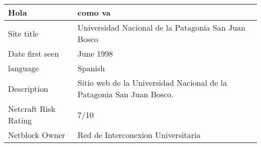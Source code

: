\begin{longtable}[]{@{}ll@{}}
\toprule
\begin{minipage}[b]{0.47\columnwidth}\raggedright
Hola\strut
\end{minipage} & \begin{minipage}[b]{0.47\columnwidth}\raggedright
como va\strut
\end{minipage}\tabularnewline
\midrule
\endhead
\begin{minipage}[t]{0.47\columnwidth}\raggedright
Site title\strut
\end{minipage} & \begin{minipage}[t]{0.47\columnwidth}\raggedright
Universidad Nacional de la Patagonia San Juan Bosco\strut
\end{minipage}\tabularnewline
\begin{minipage}[t]{0.47\columnwidth}\raggedright
Date first seen\strut
\end{minipage} & \begin{minipage}[t]{0.47\columnwidth}\raggedright
June 1998\strut
\end{minipage}\tabularnewline
\begin{minipage}[t]{0.47\columnwidth}\raggedright
language\strut
\end{minipage} & \begin{minipage}[t]{0.47\columnwidth}\raggedright
Spanish\strut
\end{minipage}\tabularnewline
\begin{minipage}[t]{0.47\columnwidth}\raggedright
Description\strut
\end{minipage} & \begin{minipage}[t]{0.47\columnwidth}\raggedright
Sitio web de la Universidad Nacional de la Patagonia San Juan
Bosco.\strut
\end{minipage}\tabularnewline
\begin{minipage}[t]{0.47\columnwidth}\raggedright
Netcraft Risk Rating\strut
\end{minipage} & \begin{minipage}[t]{0.47\columnwidth}\raggedright
7/10\strut
\end{minipage}\tabularnewline
\begin{minipage}[t]{0.47\columnwidth}\raggedright
Netblock Owner\strut
\end{minipage} & \begin{minipage}[t]{0.47\columnwidth}\raggedright
Red de Interconexion Universitaria\strut
\end{minipage}\tabularnewline

\end{longtable}
